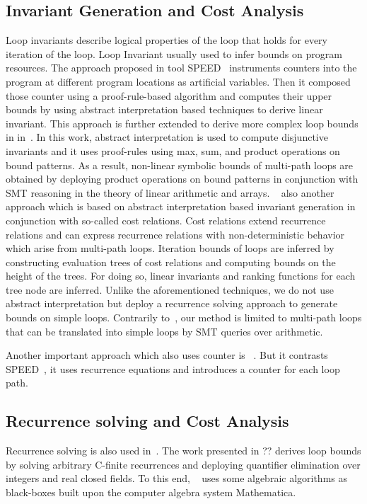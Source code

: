 \subsection{Invariant Generation and Cost Analysis} 
Loop invariants describe logical properties of the loop that holds for every iteration of the loop. Loop Invariant usually used to infer bounds on program resources.
The approach proposed in tool SPEED~\cite{speed1} instruments counters into the program at different program locations as artificial variables. Then it composed those counter using a proof-rule-based algorithm and computes their upper bounds by using abstract interpretation based techniques to derive linear invariant. This approach is further extended to derive more complex loop bounds in in~\cite{Gulwani:2010:RP:1806596.1806630}. In this work, 
abstract interpretation is used to compute disjunctive invariants and it uses proof-rules using max, sum, and product operations on bound patterns.
As a result, non-linear symbolic bounds of multi-path loops are obtained by deploying product operations on bound patterns in conjunction with SMT reasoning in the theory of linear arithmetic and arrays.  ~\cite{Albert:2011:CUB:1937961.1937986} also another approach which is based on abstract interpretation based invariant generation in conjunction with so-called cost relations. Cost relations extend recurrence relations and can express recurrence relations with non-deterministic behavior which arise from multi-path loops. Iteration bounds of loops are inferred by constructing evaluation trees of cost relations and computing bounds on the height of the trees. For doing so, linear invariants and ranking functions for each tree node are inferred. Unlike the aforementioned techniques, we do not use abstract interpretation but deploy a recurrence solving approach to generate bounds on simple loops. Contrarily to~\cite{speed1,Gulwani:2010:RP:1806596.1806630,Albert:2011:CUB:1937961.1937986}, our method is limited to multi-path loops that can be translated into simple loops by SMT queries over arithmetic.

Another important approach which also uses counter is ~\cite{Knoop:2011:SLB:2341512.2341532}. But it contrasts SPEED~\cite{speed1}, it uses recurrence equations and introduces a counter for each loop path. 

\subsection{Recurrence solving and Cost Analysis} 
Recurrence solving is also used in~\cite{10.1007/978-3-642-17511-4_7,Henzinger:2008:VVT:1484209.1484240}.
The work presented in ?? derives loop bounds by solving arbitrary C-finite recurrences and deploying quantifier elimination over integers and real closed fields. 
To this end, ~\cite{Henzinger:2008:VVT:1484209.1484240} uses some algebraic algorithms as black-boxes built upon the computer algebra system Mathematica. 

